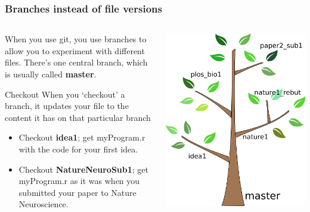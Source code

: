 \documentclass{beamer}
\begin{document}
\begin{frame}
  \frametitle{Branches instead of file versions}
  \begin{columns}[T]
    \begin{column}{.5\textwidth}
      When you use git, you use \alert{branches} to allow you to experiment with
      different files. There's one central branch, which
      is usually called \textbf{master}.
      \begin{block}{Checkout}
        When you `checkout' a branch, it updates your file to the content it
        has on that particular branch
        \begin{itemize}
          \item Checkout \textbf{idea1}; get myProgram.r with the code for
            your first idea.
          \item Checkout \textbf{NatureNeuroSub1}; get myProgram.r as it was
            when you submitted your paper to Nature Neuroscience.
        \end{itemize}
      \end{block}
    \end{column}
    \begin{column}{.5\textwidth}
      \includegraphics[width=\textwidth]{tree.png}
    \end{column}
  \end{columns}
\end{frame}
\end{document}
